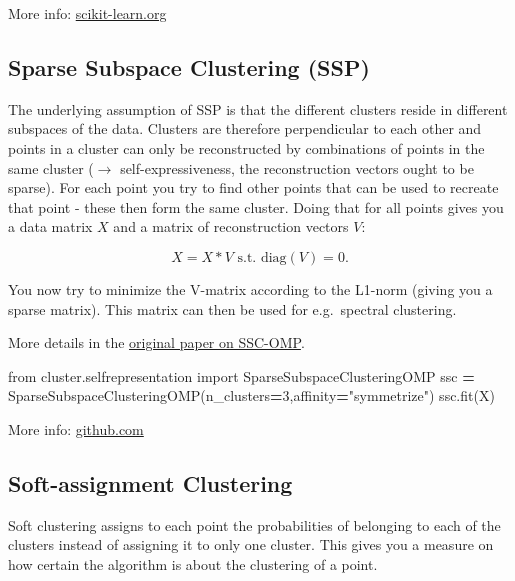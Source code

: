 \documentclass[
]{book}
\newenvironment{Shaded}{\begin{snugshade}}{\end{snugshade}}
\newcommand{\DecValTok}[1]{\textcolor[rgb]{0.00,0.00,0.81}{#1}}
\newcommand{\ImportTok}[1]{#1}
\newcommand{\NormalTok}[1]{#1}
\newcommand{\OperatorTok}[1]{\textcolor[rgb]{0.81,0.36,0.00}{\textbf{#1}}}
\newcommand{\StringTok}[1]{\textcolor[rgb]{0.31,0.60,0.02}{#1}}
\begin{document}
More info:
\href{https://scikit-learn.org/stable/modules/generated/sklearn.cluster.SpectralClustering.html}{scikit-learn.org}\\

\hypertarget{SSP}{%
\subsection{Sparse Subspace Clustering (SSP)}\label{SSP}}

The underlying assumption of SSP is that the different clusters reside
in different subspaces of the data. Clusters are therefore perpendicular
to each other and points in a cluster can only be reconstructed by
combinations of points in the same cluster (\(\rightarrow\)
self-expressiveness, the reconstruction vectors ought to be sparse). For
each point you try to find other points that can be used to recreate
that point - these then form the same cluster. Doing that for all points
gives you a data matrix \(X\) and a matrix of reconstruction vectors \(V\):

\[X = X*V\text{ s.t. diag}(V)=0.\]

You now try to minimize the V-matrix according to the L1-norm (giving
you a sparse matrix). This matrix can then be used for e.g.~spectral
clustering.

More details in the \href{https://ieeexplore.ieee.org/document/7780794}{original paper on
SSC-OMP}.

\begin{Shaded}
\begin{Highlighting}[]
\ImportTok{from}\NormalTok{ cluster.selfrepresentation }\ImportTok{import}\NormalTok{ SparseSubspaceClusteringOMP}
\NormalTok{ssc }\OperatorTok{=}\NormalTok{ SparseSubspaceClusteringOMP(n\_clusters}\OperatorTok{=}\DecValTok{3}\NormalTok{,affinity}\OperatorTok{=}\StringTok{"symmetrize"}\NormalTok{)}
\NormalTok{ssc.fit(X)}
\end{Highlighting}
\end{Shaded}

More info: \href{https://github.com/ChongYou/subspace-clustering}{github.com}

\hypertarget{soft-assignment-clustering}{%
\subsection{Soft-assignment Clustering}\label{soft-assignment-clustering}}

Soft clustering assigns to each point the probabilities of belonging to
each of the clusters instead of assigning it to only one cluster. This
gives you a measure on how certain the algorithm is about the clustering
of a point.
\end{document}
